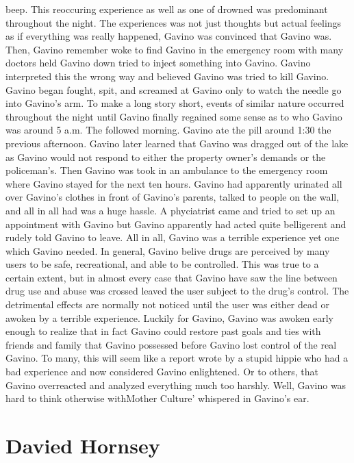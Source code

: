 \documentclass[12pt]{book}
\begin{document}
beep. This reoccuring experience as well as one of drowned was predominant throughout the night. The experiences was not just thoughts but actual feelings as if everything was really happened, Gavino was convinced that Gavino was. Then, Gavino remember woke to find Gavino in the emergency room with many doctors held Gavino down tried to inject something into Gavino. Gavino interpreted this the wrong way and believed Gavino was tried to kill Gavino. Gavino began fought, spit, and screamed at Gavino only to watch the needle go into Gavino's arm. To make a long story short, events of similar nature occurred throughout the night until Gavino finally regained some sense as to who Gavino was around 5 a.m. The followed morning. Gavino ate the pill around 1:30 the previous afternoon. Gavino later learned that Gavino was dragged out of the lake as Gavino would not respond to either the property owner's demands or the policeman's. Then Gavino was took in an ambulance to the emergency room where Gavino stayed for the next ten hours. Gavino had apparently urinated all over Gavino's clothes in front of Gavino's parents, talked to people on the wall, and all in all had was a huge hassle. A phyciatrist came and tried to set up an appointment with Gavino but Gavino apparently had acted quite belligerent and rudely told Gavino to leave. All in all, Gavino was a terrible experience yet one which Gavino needed. In general, Gavino belive drugs are perceived by many users to be safe, recreational, and able to be controlled. This was true to a certain extent, but in almost every case that Gavino have saw the line between drug use and abuse was crossed leaved the user subject to the drug's control. The detrimental effects are normally not noticed until the user was either dead or awoken by a terrible experience. Luckily for Gavino, Gavino was awoken early enough to realize that in fact Gavino could restore past goals and ties with friends and family that Gavino possessed before Gavino lost control of the real Gavino. To many, this will seem like a report wrote by a stupid hippie who had a bad experience and now considered Gavino enlightened. Or to others, that Gavino overreacted and analyzed everything much too harshly. Well, Gavino was hard to think otherwise withMother Culture' whispered in Gavino's ear.



\chapter{Davied Hornsey}
\end{document}
